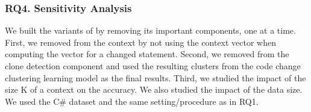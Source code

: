 





\subsubsection{\bf RQ4. Sensitivity Analysis}

We built the variants of {\tool} by removing its important components,
one at a time. First, we removed from {\tool} the context by not using
the context vector when computing the vector for a changed
statement. Second, we removed from {\tool} the clone detection
component and used the resulting clusters from the code change
clustering learning model as the final results. Third, we studied the
impact of the size K of a context on the accuracy. We also studied the
impact of the data size. We used the C\# dataset and the same
setting/procedure as in RQ1.


